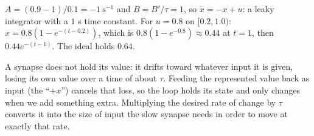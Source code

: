 \documentclass[11pt,letterpaper]{article}
\newcommand{\ans}[1]{\par\vspace{4pt}{\bfseries #1}\quad}
\begin{document}
\ans{Q2}
$A = (0.9 - 1)/0.1 = -1\ \mathrm{s^{-1}}$ and $B = B'/\tau = 1$, so $\dot x = -x + u$: a leaky integrator with a $1$ s time constant. For $u = 0.8$ on $[0.2, 1.0)$: $x = 0.8(1 - e^{-(t - 0.2)})$, which is $0.8(1 - e^{-0.8}) \approx 0.44$ at $t = 1$, then $0.44e^{-(t - 1)}$. The ideal holds $0.64$.
\begin{center}
\end{center}

\ans{Q3}
A synapse does not hold its value: it drifts toward whatever input it is given, losing its own value over a time of about $\tau$. Feeding the represented value back as input (the ``$+x$'') cancels that loss, so the loop holds its state and only changes when we add something extra. Multiplying the desired rate of change by $\tau$ converts it into the size of input the slow synapse needs in order to move at exactly that rate.
\end{document}
